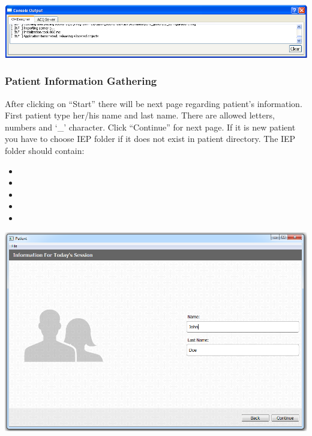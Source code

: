 \documentclass[letterpaper,10pt,english]{sphinxmanual}
\begin{document}
{\hfill\includegraphics{Console.png}\hfill}


\subsubsection{Patient Information Gathering}
\label{index:patient-information-gathering}
After clicking on ``Start'' there will be next page regarding patient's information. First patient type her/his name and last name. There are allowed letters, numbers and `\_' character. Click ``Continue'' for next page. If it is new patient you have to choose IEP folder if it does not exist in patient directory. The IEP folder should contain:
\begin{itemize}
\item {} 

\item {} 

\item {} 

\item {} 

\item {} 

\end{itemize}

{\hfill\includegraphics{NameLastName.PNG}\hfill}
\end{document}
